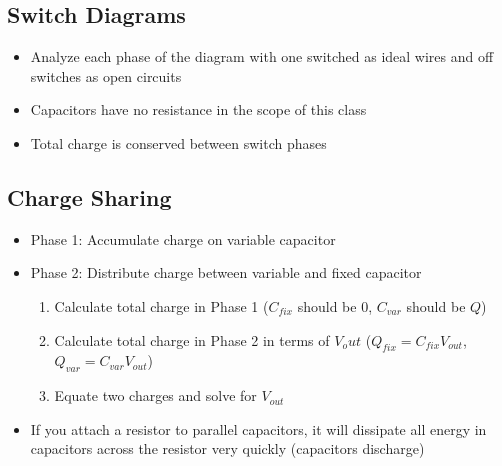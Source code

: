 \documentclass{article}\usepackage{amsmath,amssymb,amsthm,tikz,tkz-graph,color,chngpage,soul,hyperref,csquotes,graphicx,floatrow}\newcommand*{\QEDB}{\hfill\ensuremath{\square}}\newtheorem*{prop}{Proposition}\renewcommand{\theenumi}{\alph{enumi}}\usepackage[shortlabels]{enumitem}\usepackage[nobreak=true]{mdframed}\usetikzlibrary{matrix,calc}\MakeOuterQuote{"}\usepackage[margin=0.75in]{geometry} \newtheorem{theorem}{Theorem}
\begin{document}
\subsection*{Switch Diagrams}
\begin{itemize}
    \item Analyze each phase of the diagram with one switched as ideal wires and off switches as open circuits
    \item Capacitors have no resistance in the scope of this class
    \item Total charge is conserved between switch phases
\end{itemize}
\subsection*{Charge Sharing}
\begin{itemize}
    \item Phase 1: Accumulate charge on variable capacitor
    \item Phase 2: Distribute charge between variable and fixed capacitor
    \begin{enumerate}
        \item Calculate total charge in Phase 1 ($C_{fix}$ should be 0, $C_{var}$ should be $Q$)
        \item Calculate total charge in Phase 2 in terms of $V_out$ ($Q_{fix} = C_{fix}V_{out}$, $Q_{var} = C_{var}V_{out}$)
        \item Equate two charges and solve for $V_{out}$
    \end{enumerate}
    \item If you attach a resistor to parallel capacitors, it will dissipate all energy in capacitors across the resistor very quickly (capacitors discharge)
\end{itemize}
\end{document}
